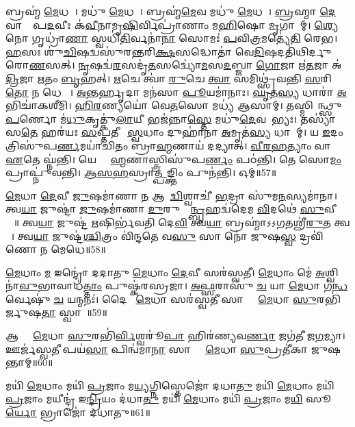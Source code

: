 𑌬𑍍𑌰𑌹𑍍𑌮॑ \ul{𑌮𑍇}𑌧𑌵𑌾᳚। 
𑌮𑌧𑍁॑ \ul{𑌮𑍇}𑌧𑌵𑌾᳚। 
𑌬𑍍𑌰𑌹𑍍𑌮॑\ul{𑌮𑍇}𑌵 𑌮𑌧𑍁॑ \ul{𑌮𑍇}𑌧𑌵𑌾᳚। 
\ul{𑌬𑍍𑌰}𑌹𑍍𑌮𑌾 \ul{𑌦𑍇}𑌵𑌾𑌨𑌾𑌂᳚ 𑌪\ul{𑌦}𑌵𑍀𑌃 𑌕॑\ul{𑌵𑍀}𑌨𑌾𑌮𑍃\ul{𑌷𑌿}𑌰𑍍𑌵𑌿𑌪𑍍𑌰𑌾॑𑌣𑌾𑌂 𑌮\ul{𑌹𑌿}𑌷𑍋 \ul{𑌮𑍃}𑌗𑌾𑌣𑌾᳚𑌮𑍍। 
\ul{𑌶𑍍𑌯𑍇}𑌨𑍋 𑌗𑍃𑌧𑍍𑌰𑌾॑\ul{𑌣𑌾}\ul{} 𑌸𑍍𑌵𑌧𑌿॑\ul{𑌤𑌿}𑌰𑍍𑌵𑌨𑌾॑\ul{𑌨𑌾}\ul{} 𑌸𑍋𑌮𑌃॑ \ul{𑌪}𑌵𑌿\ul{𑌤𑍍𑌰}𑌮𑌤𑍍𑌯𑍇॑\ul{𑌤𑌿} 𑌰𑍇𑌭\sn{}। 
\ul{𑌹}\ul{}𑌸𑌃 𑌶𑍁॑\ul{𑌚𑌿}𑌷𑌦𑍍𑌵𑌸𑍁॑𑌰𑌨𑍍𑌤𑌰𑌿\ul{𑌕𑍍𑌷}𑌸𑌦𑍍𑌧𑍋𑌤𑌾॑ 𑌵𑍇\ul{𑌦𑌿}𑌷𑌦𑌤𑌿॑𑌥𑌿𑌰𑍍𑌦𑍁𑌰𑍋\ul{𑌣}𑌸𑌤𑍍। 
\ul{𑌨𑍃}𑌷𑌦𑍍𑌵॑\ul{𑌰}𑌸𑌦𑍃॑\ul{𑌤}𑌸𑌦𑍍𑌵𑍍𑌯𑍋॑\ul{𑌮}𑌸\ul{𑌦}𑌬𑍍𑌜𑌾 \ul{𑌗𑍋}𑌜𑌾 𑌋॑\ul{𑌤}𑌜𑌾 𑌅॑\ul{𑌦𑍍𑌰𑌿}𑌜𑌾 \ul{𑌋}𑌤𑌂 \ul{𑌬𑍃}𑌹𑌤𑍍। 
\ul{𑌋}𑌚𑍇 𑌤𑍍𑌵𑌾॑ \ul{𑌰𑍁}𑌚𑍇 \ul{𑌤𑍍𑌵𑌾} 𑌸𑌮𑌿𑌥𑍍𑌸𑍍𑌰॑𑌵𑌨𑍍𑌤𑌿 \ul{𑌸}𑌰𑌿\ul{𑌤𑍋} 𑌨 𑌧𑍇𑌨𑌾𑌃᳚। 
\ul{𑌅}𑌨𑍍𑌤𑌰𑍍\mbox{}\ul{𑌹𑍃}𑌦𑌾 𑌮𑌨॑𑌸𑌾 \ul{𑌪𑍂}𑌯𑌮𑌾॑𑌨𑌾𑌃। 
\ul{𑌘𑍃}𑌤\ul{𑌸𑍍𑌯} 𑌧𑌾𑌰𑌾॑ \ul{𑌅}𑌭𑌿𑌚𑌾॑𑌕𑌶𑍀𑌮𑌿। 
\ul{𑌹𑌿}\ul{𑌰}𑌣𑍍𑌯𑌯𑍋॑ 𑌵𑍇\ul{𑌤}𑌸𑍋 𑌮𑌧𑍍𑌯॑ 𑌆𑌸𑌾𑌮𑍍। 
\mbox{𑌤𑌸𑍍𑌮𑌿 ᳚\hspace{-1.25ex}𑌨𑍍𑌥𑍍𑌸𑍁}\-\ul{𑌪}𑌰𑍍𑌣𑍋 𑌮॑\ul{𑌧𑍁}𑌕𑍃𑌤𑍍𑌕𑍁॑\ul{𑌲𑌾}𑌯𑍀 𑌭𑌜॑𑌨𑍍𑌨𑌾\ul{𑌸𑍍𑌤𑍇} 𑌮𑌧𑍁॑\-\ul{𑌦𑍇}𑌵𑌤𑌾᳚𑌭𑍍𑌯𑌃। 
𑌤𑌸𑍍𑌯𑌾॑𑌸\ul{𑌤𑍇} 𑌹𑌰॑𑌯𑌃 \ul{𑌸}𑌪𑍍𑌤𑌤𑍀𑌰𑍇᳚ \ul{𑌸𑍍𑌵}𑌧𑌾𑌂 𑌦𑍁𑌹𑌾॑𑌨𑌾 \ul{𑌅}𑌮𑍃𑌤॑\ul{𑌸𑍍𑌯} 𑌧𑌾𑌰𑌾᳚𑌮𑍍। 
𑌯 \ul{𑌇}𑌦𑌂 𑌤𑍍𑌰𑌿𑌸𑍁॑𑌪\ul{𑌰𑍍𑌣}𑌮𑌯𑌾॑𑌚𑌿𑌤𑌂 𑌬𑍍𑌰𑌾\ul{𑌹𑍍𑌮}𑌣𑌾𑌯॑ 𑌦𑌦𑍍𑌯𑌾𑌤𑍍। 
\ul{𑌵𑍀}\ul{𑌰}\ul{𑌹}𑌤𑍍𑌯𑌾𑌂 𑌵𑌾 \ul{𑌏}𑌤𑍇 𑌘𑍍𑌨॑𑌨𑍍𑌤𑌿। 
𑌯𑍇 𑌬𑍍𑌰𑌾᳚\ul{𑌹𑍍𑌮}𑌣𑌾𑌸𑍍𑌤𑍍𑌰𑌿𑌸𑍁॑𑌪\ul{𑌰𑍍𑌣𑌂} 𑌪𑌠॑𑌨𑍍𑌤𑌿। 
𑌤𑍇 𑌸𑍋\ul{𑌮𑌂} 𑌪𑍍𑌰𑌾𑌪𑍍𑌨𑍁॑𑌵𑌨𑍍𑌤𑌿। 
\ul{𑌆}\ul{𑌸}\ul{𑌹}𑌸𑍍𑌰𑌾\ul{𑌤𑍍𑌪}𑌙𑍍𑌕𑍍𑌤𑌿𑌂 𑌪𑍁𑌨॑𑌨𑍍𑌤𑌿। 
𑌓𑌮𑍍॥57॥
\anuvakamend

\ul{𑌮𑍇}𑌧𑌾 \ul{𑌦𑍇}𑌵𑍀 \ul{𑌜𑍁}𑌷𑌮𑌾॑𑌣𑌾 \ul{𑌨} 𑌆𑌗𑌾᳚\ul{𑌦𑍍𑌵𑌿}𑌶𑍍𑌵𑌾𑌚𑍀॑ \ul{𑌭}𑌦𑍍𑌰𑌾 𑌸𑍁॑𑌮\ul{𑌨}𑌸𑍍𑌯𑌮𑌾॑𑌨𑌾। 
𑌤𑍍𑌵\ul{𑌯𑌾} 𑌜𑍁𑌷𑍍𑌟𑌾॑ \ul{𑌜𑍁}𑌷𑌮𑌾॑𑌣𑌾 \ul{𑌦𑍁}𑌰𑍁𑌕𑍍𑌤𑌾᳚\ul{𑌨𑍍𑌬𑍃}𑌹𑌦𑍍𑌵॑𑌦𑍇𑌮 \ul{𑌵𑌿}𑌦𑌥𑍇॑ \ul{𑌸𑍁}𑌵𑍀𑌰𑌾𑌃᳚॥ 
𑌤𑍍𑌵\ul{𑌯𑌾} 𑌜𑍁𑌷𑍍𑌟॑ \ul{𑌋}𑌷𑌿𑌰𑍍𑌭॑𑌵𑌤𑌿 𑌦𑍇\ul{𑌵𑌿} 𑌤𑍍𑌵\ul{𑌯𑌾} 𑌬𑍍𑌰𑌹𑍍𑌮𑌾॑𑌽𑌽\ul{𑌗}𑌤𑌶𑍍𑌰𑍀॑\ul{𑌰𑍁}𑌤 𑌤𑍍𑌵𑌯𑌾᳚। 
𑌤𑍍𑌵\ul{𑌯𑌾} 𑌜𑍁𑌷𑍍𑌟॑\ul{𑌶𑍍𑌚𑌿}𑌤𑍍𑌰𑌂 𑌵𑌿॑𑌨𑍍𑌦𑌤𑍇 𑌵\ul{𑌸𑍁} 𑌸𑌾 𑌨𑍋॑ 𑌜𑍁𑌷\ul{𑌸𑍍𑌵} 𑌦𑍍𑌰𑌵𑌿॑𑌣𑍋 𑌨 𑌮𑍇𑌧𑍇॥58॥
\anuvakamend


\ul{𑌮𑍇}𑌧𑌾𑌂 \ul{𑌮} 𑌇𑌨𑍍𑌦𑍍𑌰𑍋॑ 𑌦𑌦𑌾𑌤𑍁 \ul{𑌮𑍇}𑌧𑌾𑌂 \ul{𑌦𑍇}𑌵𑍀 𑌸𑌰॑𑌸𑍍𑌵𑌤𑍀। 
\ul{𑌮𑍇}𑌧𑌾𑌂 𑌮𑍇॑ \ul{𑌅}𑌶𑍍𑌵𑌿𑌨𑌾॑\ul{𑌵𑍁}𑌭𑌾𑌵𑌾𑌧॑\ul{𑌤𑍍𑌤𑌾𑌂} 𑌪𑍁𑌷𑍍𑌕॑𑌰𑌸𑍍𑌰𑌜𑌾। 
\ul{𑌅}\ul{𑌫𑍍𑌸}𑌰𑌾𑌸𑍁॑ \ul{𑌚} 𑌯𑌾 \ul{𑌮𑍇}𑌧𑌾 𑌗॑\ul{𑌨𑍍𑌧}𑌰𑍍𑌵𑍇𑌷𑍁॑ \ul{𑌚} 𑌯𑌨𑍍𑌮𑌨𑌃॑। 
𑌦𑍈𑌵𑍀𑌂᳚ \ul{𑌮𑍇}𑌧𑌾 𑌸𑌰॑𑌸𑍍𑌵\ul{𑌤𑍀} 𑌸𑌾 𑌮𑌾𑌂᳚ \ul{𑌮𑍇}𑌧𑌾 \ul{𑌸𑍁}𑌰𑌭𑌿॑𑌰𑍍𑌜𑍁𑌷\ul{𑌤𑌾}\ul{} 𑌸𑍍𑌵𑌾𑌹𑌾᳚॥59॥
\anuvakamend


𑌆 𑌮𑌾𑌂᳚ \ul{𑌮𑍇}𑌧𑌾 \ul{𑌸𑍁}𑌰𑌭𑌿॑\ul{𑌰𑍍𑌵𑌿}𑌶𑍍𑌵𑌰𑍂॑\ul{𑌪𑌾} 𑌹𑌿𑌰॑𑌣𑍍𑌯𑌵\ul{𑌰𑍍𑌣𑌾} 𑌜𑌗॑𑌤𑍀 𑌜\ul{𑌗}𑌮𑍍𑌯𑌾। 
𑌊𑌰𑍍𑌜॑𑌸𑍍𑌵\ul{𑌤𑍀} 𑌪𑌯॑\ul{𑌸𑌾} 𑌪𑌿𑌨𑍍𑌵॑𑌮𑌾\ul{𑌨𑌾} 𑌸𑌾 𑌮𑌾𑌂᳚ \ul{𑌮𑍇}𑌧𑌾 \ul{𑌸𑍁}𑌪𑍍𑌰𑌤𑍀॑𑌕𑌾 𑌜𑍁𑌷𑌨𑍍𑌤𑌾𑌮𑍍॥60॥ 
\anuvakamend

𑌮𑌯𑌿॑ \ul{𑌮𑍇}𑌧𑌾𑌂 𑌮𑌯𑌿॑ \ul{𑌪𑍍𑌰}𑌜𑌾𑌂 𑌮\ul{𑌯𑍍𑌯}𑌗𑍍𑌨𑌿𑌸𑍍𑌤𑍇𑌜𑍋॑ 𑌦𑌧𑌾\ul{𑌤𑍁} 𑌮𑌯𑌿॑ \ul{𑌮𑍇}𑌧𑌾𑌂 𑌮𑌯𑌿॑ \ul{𑌪𑍍𑌰}𑌜𑌾𑌂 𑌮𑌯𑍀𑌨𑍍𑌦𑍍𑌰॑ 𑌇\ul{𑌨𑍍𑌦𑍍𑌰𑌿}𑌯𑌂 𑌦॑𑌧𑌾\ul{𑌤𑍁} 𑌮𑌯𑌿॑ \ul{𑌮𑍇}𑌧𑌾𑌂 𑌮𑌯𑌿॑ \ul{𑌪𑍍𑌰}𑌜𑌾𑌂 𑌮\ul{𑌯𑌿} 𑌸𑍂\ul{𑌰𑍍𑌯𑍋} 𑌭𑍍𑌰𑌾𑌜𑍋॑ 𑌦𑌧𑌾𑌤𑍁॥61॥ 
\anuvakamend


